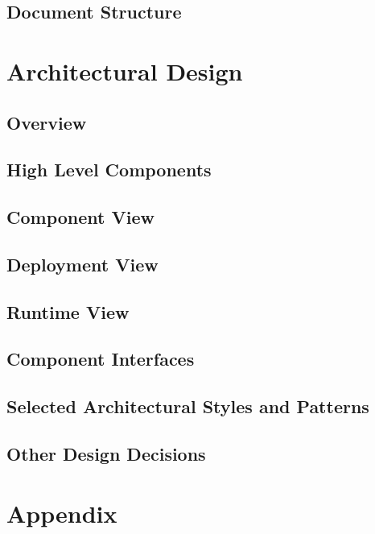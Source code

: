 \documentclass[a4paper,12pt]{report}
\begin{document}
\section{Document Structure}


\chapter{Architectural Design}
\label{ch:Arch_Design}

\section{Overview}


\newpage
\section{High Level Components}\label{high_level_comps}


\section{Component View}\label{component_view}


\section{Deployment View}\label{deployment_view}


\section{Runtime View}\label{runtime_view}


\section{Component Interfaces}\label{component_if}


\section{Selected Architectural Styles and Patterns}\label{sel_arch_styles_patterns}


\section{Other Design Decisions}\label{other_decisions}


\appendix
\chapter{Appendix}



\end{document}
